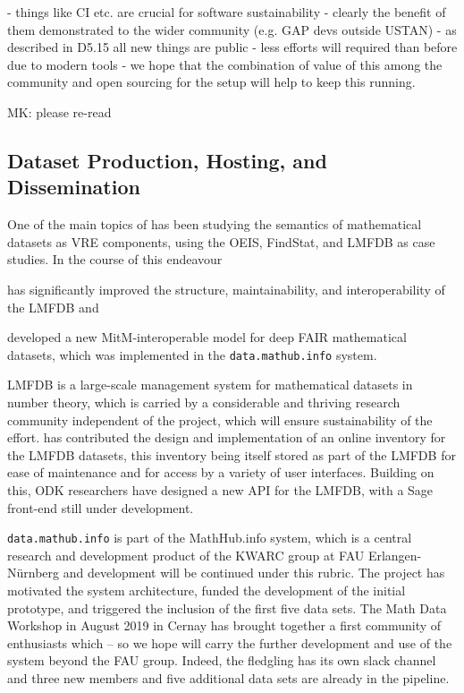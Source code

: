 \documentclass{deliverablereport}
\def\dmh{\texttt{data.mathub.info}\xspace}
\begin{document}
- things like CI etc. are crucial for software sustainability
- clearly the benefit of them demonstrated to the wider community (e.g. GAP devs outside USTAN)
- as described in D5.15 all new things are public
- less efforts will required than before due to modern tools
- we hope that the combination of value of this among the community and open sourcing for the setup will help to keep this running.


\begin{newpart}{MK: please re-read}
\subsection{Dataset Production, Hosting, and Dissemination}

One of the main topics of  has been studying the semantics of mathematical
datasets as VRE components, using the OEIS, FindStat, and LMFDB as case studies. In the
course of this endeavour \pn
\begin{compactenum}
\item has significantly improved the structure, maintainability, and interoperability of
  the LMFDB and
\item developed a new MitM-interoperable model for deep FAIR mathematical datasets, which
  was implemented in the \dmh system. 
\end{compactenum}
LMFDB is a large-scale management system for mathematical datasets in number theory, which
is carried by a considerable and thriving research community independent of the \pn
project, which will ensure sustainability of the effort.
\pn has contributed the design and implementation of an online inventory for the LMFDB datasets, 
this inventory being itself stored as part of the LMFDB for ease of maintenance and for access by a variety of user interfaces.
Building on this, ODK researchers have designed a new API for the LMFDB, with a Sage front-end still under development.




\dmh is part of the MathHub.info system, which is a central research and development
product of the KWARC group at FAU Erlangen-N\"urnberg and development will be continued
under this rubric.
The \pn project has motivated the system architecture, funded the development of the
initial prototype, and triggered the inclusion of the first five data sets.
The Math Data Workshop in August 2019 in Cernay has brought together a first community of
enthusiasts which -- so we hope will carry the further development and use of the system
beyond the FAU group.
Indeed, the fledgling has its own slack channel and three new members and five additional
data sets are already in the pipeline. 
\end{newpart}
\end{document}

